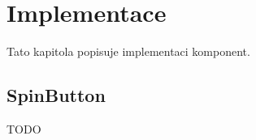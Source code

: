 \chapter{Implementace}

Tato kapitola popisuje implementaci komponent.

\section{SpinButton}

TODO









